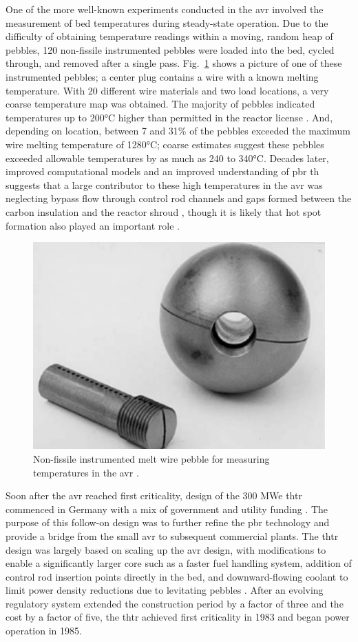 One of the more well-known experiments conducted in the \gls{avr} involved the measurement of bed temperatures during steady-state operation. Due to the difficulty of obtaining temperature readings within a moving, random heap of pebbles, 120 non-fissile instrumented pebbles were loaded into the bed, cycled through, and removed after a single pass. Fig.\ \ref{fig:avr_melt} shows a picture of one of these instrumented pebbles; a center plug contains a wire with a known melting temperature. With 20 different wire materials and two load locations, a very coarse temperature map was obtained. The majority of pebbles indicated temperatures up to 200\si{\celsius} higher than permitted in the reactor license \cite{sobes,moormann}. And, depending on location, between 7 and 31\% of the pebbles exceeded the maximum wire melting temperature of 1280\si{\celsius}; coarse estimates suggest these pebbles exceeded allowable temperatures by as much as 240 to 340\si{\celsius}. Decades later, improved computational models and an improved understanding of \gls{pbr} \gls{th} suggests that a large contributor to these high temperatures in the \gls{avr} was neglecting bypass flow through control rod channels and gaps formed between the carbon insulation and the reactor shroud \cite{viljoen}, though it is likely that hot spot formation also played an important role \cite{moormann}.

\begin{figure}[!h]
\centering
\includegraphics[width=0.4\linewidth]{figs/avr_melt_wire.png}
\caption{Non-fissile instrumented melt wire pebble for measuring temperatures in the \gls{avr} \cite{sobes}.}
\label{fig:avr_melt}
\end{figure}

Soon after the \gls{avr} reached first criticality, design of the 300 MWe \gls{thtr} commenced in Germany with a mix of government and utility funding \cite{oehme,thtr_1990,hecker,hofmann}. The purpose of this follow-on design was to further refine the \gls{pbr} technology and provide a bridge from the small \gls{avr} to subsequent commercial plants. The \gls{thtr} design was largely based on scaling up the \gls{avr} design, with modifications to enable a significantly larger core such as a faster fuel handling system, addition of control rod insertion points directly in the bed, and downward-flowing coolant to limit power density reductions due to levitating pebbles \cite{claxton}. After an evolving regulatory system extended the construction period by a factor of three and the cost by a factor of five, the \gls{thtr} achieved first criticality in 1983 and began power operation in 1985. 

